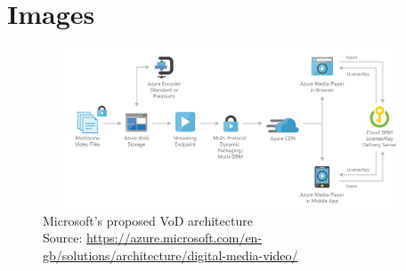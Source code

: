 \documentclass[english]{lni}
\begin{document}
\section*{Images}
\begin{figure}[ht]
    \centering
    \includegraphics[width=1\textwidth, height=180px]{ressources/architecture_MS.PNG}
    \caption{Microsoft's proposed VoD architecture\\\hspace{\textwidth}Source: \url{https://azure.microsoft.com/en-gb/solutions/architecture/digital-media-video/}}
    \label{fig:arch_ms}
\end{figure}

%
%

\printbibliography
\end{document}
